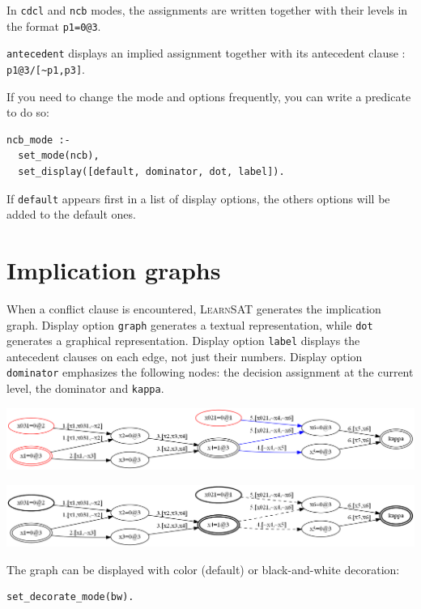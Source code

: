\documentclass[11pt]{article}
\newcommand*{\p}[1]{\textup{\texttt{#1}}}
\newcommand*{\ls}{\textsc{LearnSAT}}
\begin{document}
In \p{cdcl} and \p{ncb} modes, the assignments are written together with
their levels in the format \p{p1=0@3}.

\p{antecedent} displays an implied assignment together with its
antecedent clause : \verb+p1@3/[~p1,p3]+.

If you need to change the mode and options frequently, you can write a
predicate to do so:

\begin{verbatim}
ncb_mode :-
  set_mode(ncb), 
  set_display([default, dominator, dot, label]).
\end{verbatim}

If \p{default} appears first in a list of display options, the
others options will be added to the default ones.

\newpage

\section{Implication graphs}\label{s.impl}

When a conflict clause is encountered, \ls{} generates the implication
graph. Display option \p{graph} generates a textual representation,
while \p{dot} generates a graphical representation. Display option
\p{label} displays the antecedent clauses on each edge, not just their
numbers. Display option \p{dominator} emphasizes the following nodes:
the decision assignment at the current level, the dominator and
\p{kappa}.

\begin{center}
\includegraphics[keepaspectratio=true,width=.9\textwidth]{graph-color}

\bigskip

\includegraphics[keepaspectratio=true,width=.9\textwidth]{graph-bw}
\end{center}

The graph can be displayed with color (default) or black-and-white
decoration:

\begin{verbatim}
set_decorate_mode(bw).
\end{verbatim}
\end{document}
